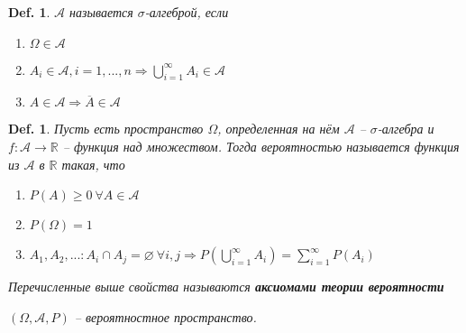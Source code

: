 \documentclass[12pt]{article}
\newenvironment{MyList}[1][4pt]{
  \begin{enumerate}[1.]
  \setlength{\parskip}{0pt}
  \setlength{\itemsep}{#1}
}{       
  \end{enumerate}
}
\def\R{\mathbb{R}}       %
\def\SO{\Rightarrow}     %
\theoremstyle{definition} %
\theoremstyle{plain} %
\newtheorem{Def}[Thm]{Def.} %
\theoremstyle{remark} %
\begin{document}
\begin{Def}
    $\mathscr{A}$ называется $\sigma$-алгеброй, если 
    \begin{MyList}
        \item $\Omega \in \mathscr{A}$ 
        \item $A_i \in \mathscr{A}, i = 1, ..., n \SO \bigcup_{i = 1}^\infty A_i \in \mathscr{A}$
        \item $A \in \mathscr{A} \SO \overline{A} \in \mathscr{A}$
    \end{MyList} 
\end{Def}

\begin{Def}
    Пусть есть пространство $\Omega$, определенная на нём $\mathscr{A}$ -- $\sigma$-алгебра и $f: \mathscr{A} \to \R$ -- функция над множеством.
    Тогда вероятностью называется функция из $\mathscr{A}$ в $\R$ такая, что
    \begin{MyList}
        \item $P(A) \geqslant 0 \ \forall A \in \mathscr{A}$ 
        \item $P(\Omega) = 1$
        \item $A_1, A_2, ... : A_i \cap A_j = \varnothing \ \forall i, j \SO P(\bigcup_{i = 1}^\infty A_i) = \sum_{i=1}^{\infty} P(A_i)$  
    \end{MyList}
    Перечисленные выше свойства называются \textbf{аксиомами теории вероятности}
    
    $(\Omega, \mathscr{A}, P)$ -- вероятностное пространство.
\end{Def}
\end{document}
